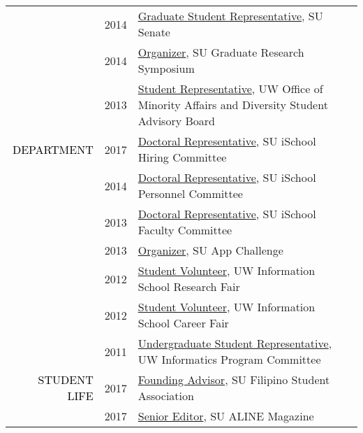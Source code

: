 \documentclass[12pt]{article}
\begin{document}
{{\begin{longtable}{Rp{1.0in}p{0.25in}p{4.75in}}
& \footnotesize{2014} & \href{http://universitysenate.syr.edu/}{{Graduate Student Representative}}, SU Senate \\

& \footnotesize{2014} & \href{https://www.facebook.com/sugrads/photos/tab=album\&album\_id=874022975972914}{{Organizer}}, SU Graduate Research Symposium \\

& \footnotesize{2013} & \href{http://www.washington.edu/omad/2014/05/09/no-longer-invisible-bryan-dosono/}{{Student Representative}}, UW Office of Minority Affairs and Diversity Student Advisory Board \\

\textcolor{black}{\footnotesize{\uppercase{Department}}} & \footnotesize{2017} & 
 \href{http://ischool.syr.edu/facstaff/}{{Doctoral Representative}}, SU iSchool Hiring Committee \\

& \footnotesize{2014} & \href{http://ischool.syr.edu/facstaff/}{{Doctoral Representative}}, SU iSchool Personnel Committee \\

& \footnotesize{2013} & \href{http://ischool.syr.edu/facstaff/}{{Doctoral Representative}}, SU iSchool Faculty Committee \\

& \footnotesize{2013} & \href{http://appchallenge.syr.edu/}{{Organizer}}, SU App Challenge \\

& \footnotesize{2012} & \href{http://ischool.uw.edu/current/career-services}{{Student Volunteer}}, UW Information School Research Fair \\

& \footnotesize{2012} & \href{https://web.archive.org/web/20130104065107/https://ischool.uw.edu/news/2012/11/annual-ischool-research-fair-showcases-faculty-and-student-work}{{Student Volunteer}}, UW Information School Career Fair \\

& \footnotesize{2011} & \href{https://ischool.uw.edu/about/leadership}{{Undergraduate Student Representative}}, UW Informatics Program Committee \\

\textcolor{black}{\footnotesize{\uppercase{Student Life}}} & \footnotesize{2017} & 
 \href{https://www.facebook.com/syracusefsa/}{{Founding Advisor}}, SU Filipino Student Association \\

& \footnotesize{2017} & \href{https://issuu.com/alinemagazine}{{Senior Editor}}, SU ALINE Magazine \\


\end{longtable}}}
\end{document}
